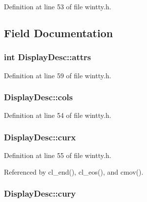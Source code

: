 Definition at line 53 of file wintty.\+h.



\subsection{Field Documentation}
\hypertarget{structDisplayDesc_a572f46f1d3d2c38e0f8b4f98d89146a8}{
\subsubsection[{attrs}]{\setlength{\rightskip}{0pt plus 5cm}int Display\+Desc\+::attrs}}\label{structDisplayDesc_a572f46f1d3d2c38e0f8b4f98d89146a8}


Definition at line 59 of file wintty.\+h.

\hypertarget{structDisplayDesc_ab39648e3369fe48107300cdc04f66a4b}{
\subsubsection[{cols}]{ Display\+Desc\+::cols}}\label{structDisplayDesc_ab39648e3369fe48107300cdc04f66a4b}


Definition at line 54 of file wintty.\+h.

\hypertarget{structDisplayDesc_a8c612d7cc16ceb505542221371392e34}{
\subsubsection[{curx}]{ Display\+Desc\+::curx}}\label{structDisplayDesc_a8c612d7cc16ceb505542221371392e34}


Definition at line 55 of file wintty.\+h.



Referenced by cl\+\_\+end(), cl\+\_\+eos(), and cmov().

\hypertarget{structDisplayDesc_ad5f7059d70f6aec54ca124dfc178a75b}{
\subsubsection[{cury}]{ Display\+Desc\+::cury}}\label{structDisplayDesc_ad5f7059d70f6aec54ca124dfc178a75b}


